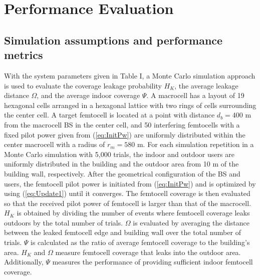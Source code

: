 \documentclass[draftclsnofoot,12pt,onecolumn]{IEEEtran}
\begin{document}
\section{Performance Evaluation}\label{sec:results}
\subsection{Simulation assumptions and performance metrics}
With the system parameters given in Table I, a Monte Carlo
simulation approach is used to evaluate the coverage leakage
probability $H_K$, the average leakage distance $\Omega$, and the
average indoor coverage $\Psi$. A macrocell has a layout of 19
hexagonal cells arranged in a hexagonal lattice with two rings of
cells surrounding the center cell. A target femtocell is located at
a point with distance $d_b=400$ m from the macrocell BS in the
center cell, and 50 interfering femtocells with a fixed pilot power
given from (\ref{eq:InitPw}) are uniformly distributed within the
center macrocell with a radius of $r_m=580$ m. For each simulation
repetition in a Monte Carlo simulation with 5,000 trials, the indoor
and outdoor users are uniformly distributed in the building and the
outdoor area from 10 m of the building wall, respectively. After
the geometrical configuration of the BS and users, the femtocell
pilot power is initiated from (\ref{eq:InitPw}) and is optimized by
using (\ref{eq:Update1}) until it converges. The femtocell coverage
is then evaluated so that the received pilot power of femtocell is
larger than that of the macrocell. $H_K$ is obtained by dividing the
number of events where femtocell coverage leaks outdoors by the
total number of trials. $\Omega$ is evaluated by averaging the
distance between the leaked femtocell edge and building wall over
the total number of trials. $\Psi$ is calculated as the ratio of
average femtocell coverage to the building's area. $H_K$ and
$\Omega$ measure femtocell coverage that leaks into the outdoor
area. Additionally, $\Psi$ measures the performance of providing
sufficient indoor femtocell coverage.
\end{document}
